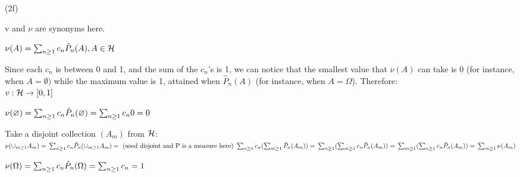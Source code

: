 (2f)

v and $\nu$ are synonyms here.

$
\nu(A) = \csum c_n \hat{P}_n(A), A \in \sigAlg
$

Since each $c_n$ is between 0 and 1, and the sum of the $c_n$'s is 1, we can notice that the smallest value that $\nu(A)$ can take is 0 (for instance, when $A = \emptyset)$ while the maximum value is 1, attained when $\hat{P}_n(A)$ (for instance, when $A = \Omega$). Therefore:\\
$ v: \sigAlg \rightarrow [0, 1] $

$
\nu(\emptyset) =
\csum c_n \hat{P}_n(\emptyset) =
\csum c_n0 =
0
$

Take a disjoint collection $(A_m)$ from $\sigAlg$:\\
$
\nu(\cunion[m] A_m) = \\
\csum[n] c_n \hat{P}_n(\cunion[m] A_m) = \text{ (used disjoint and P is a measure here) } \\
\csum[n] c_n (\csum[m] \hat{P}_n(A_m)) = \\
\csum[n] (\csum[m] c_n \hat{P}_n(A_m)) = \\
\csum[m] (\csum[n] c_n \hat{P}_n(A_m)) = \\
\csum[m] \nu(A_m)
$

$
\nu(\Omega) =
\csum c_n \hat{P}_n(\Omega) =
\csum c_n =
1
$